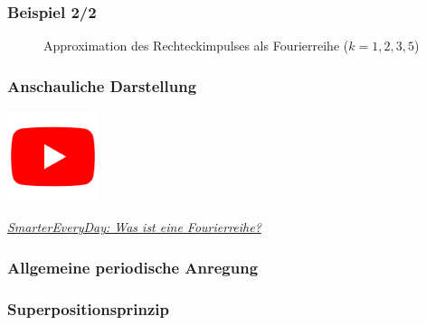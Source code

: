 \documentclass[hyperref={pdfpagemode=FullScreen, colorlinks=false}]{beamer}
\begin{document}
\begin{frame}
\frametitle{Beispiel 2/2}
\begin{figure}

\caption{Approximation des Rechteckimpulses als Fourierreihe ($k=1,2,3,5$)}
\end{figure}
\end{frame}


\begin{frame}
\frametitle{Anschauliche Darstellung}
\vfill
\begin{center}
\includegraphics[width=0.2\textwidth]{fig_img/youtube.png}  

\href{https://www.youtube.com/watch?v=ds0cmAV-Yek}{\textsl{SmarterEveryDay: Was ist eine Fourierreihe?}}
\end{center}  
\vfill
\end{frame}


\subsubsection{Allgemeine periodische Anregung}

\begin{frame}
\frametitle{Superpositionsprinzip}
\begin{center}

\end{center}
\end{frame}
\end{document}
